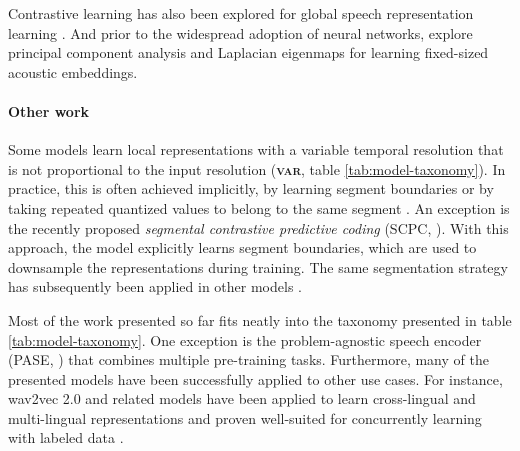 Contrastive learning has also been explored for global speech representation learning \citep{milde2018unspeech, jati2019neural, jansen2018unsupervised}. And prior to the widespread adoption of neural networks, \citet{levin2013fixed} explore principal component analysis and Laplacian eigenmaps for learning fixed-sized acoustic embeddings.



\paragraph{Other work} Some models learn local representations with a variable temporal resolution that is not proportional to the input resolution (\textbf{\textsc{var}}, table \ref{tab:model-taxonomy}). In practice, this is often achieved implicitly, by learning segment boundaries or by taking repeated quantized values to belong to the same segment \cite{kamper2020towards, chorowski2019unsupervised, michel2017blind, kreuk2020self, wang2017gate, dieleman_variable-rate_2021}. An exception is the recently proposed \emph{segmental contrastive predictive coding} (SCPC, \citealp{bhati2021segmental, bhati2021unsupervised}). With this approach, the model explicitly learns segment boundaries, which are used to downsample the representations during training. The same segmentation strategy has subsequently been applied in other models \cite{cuervo2021contrastive}.

Most of the work presented so far fits neatly into the taxonomy presented in table \ref{tab:model-taxonomy}. One exception is the problem-agnostic speech encoder (PASE, \citealp{Pascual2019, Ravanelli2020}) that combines multiple pre-training tasks. Furthermore, many of the presented models have been successfully applied to other use cases. For instance, wav2vec 2.0 and related models have been applied to learn cross-lingual and multi-lingual representations \cite{riviere2020unsupervised, conneau2020unsupervised, khurana2021magic} and proven well-suited for concurrently learning with labeled data \cite{talnikar2021joint, wang2021unispeech}. %


